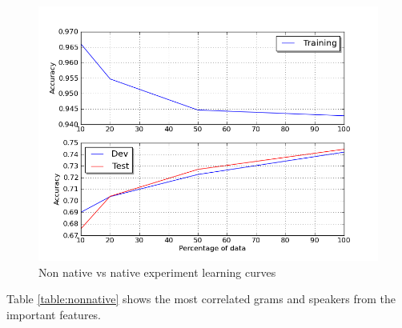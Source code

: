 \documentclass[11pt]{article}
\begin{document}
\begin{figure}[htp]
\centering
\includegraphics[scale=0.45]{native_lc.png}
\caption{Non native vs native experiment learning curves}
\label{non_lc}
\end{figure}

Table \ref{table:nonnative} shows the most correlated grams and speakers from the important features.
\end{document}
